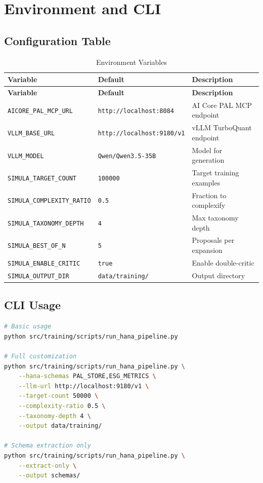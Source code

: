 \section{Environment and CLI}
\label{chap:config}

\subsection{Configuration Table}

\begin{longtable}{p{5cm}p{3cm}p{6cm}}
\caption{Environment Variables} \\
\toprule
\textbf{Variable} & \textbf{Default} & \textbf{Description} \\
\midrule
\endfirsthead
\toprule
\textbf{Variable} & \textbf{Default} & \textbf{Description} \\
\midrule
\endhead
\texttt{AICORE\_PAL\_MCP\_URL} & \texttt{http://localhost:8084} & AI Core PAL MCP endpoint \\
\texttt{VLLM\_BASE\_URL} & \texttt{http://localhost:9180/v1} & vLLM TurboQuant endpoint \\
\texttt{VLLM\_MODEL} & \texttt{Qwen/Qwen3.5-35B} & Model for generation \\
\texttt{SIMULA\_TARGET\_COUNT} & \texttt{100000} & Target training examples \\
\texttt{SIMULA\_COMPLEXITY\_RATIO} & \texttt{0.5} & Fraction to complexify \\
\texttt{SIMULA\_TAXONOMY\_DEPTH} & \texttt{4} & Max taxonomy depth \\
\texttt{SIMULA\_BEST\_OF\_N} & \texttt{5} & Proposals per expansion \\
\texttt{SIMULA\_ENABLE\_CRITIC} & \texttt{true} & Enable double-critic \\
\texttt{SIMULA\_OUTPUT\_DIR} & \texttt{data/training/} & Output directory \\
\bottomrule
\end{longtable}

\subsection{CLI Usage}

\begin{lstlisting}[language=bash,caption={CLI entry point}]
# Basic usage
python src/training/scripts/run_hana_pipeline.py

# Full customization
python src/training/scripts/run_hana_pipeline.py \
    --hana-schemas PAL_STORE,ESG_METRICS \
    --llm-url http://localhost:9180/v1 \
    --target-count 50000 \
    --complexity-ratio 0.5 \
    --taxonomy-depth 4 \
    --output data/training/

# Schema extraction only
python src/training/scripts/run_hana_pipeline.py \
    --extract-only \
    --output schemas/
\end{lstlisting}

